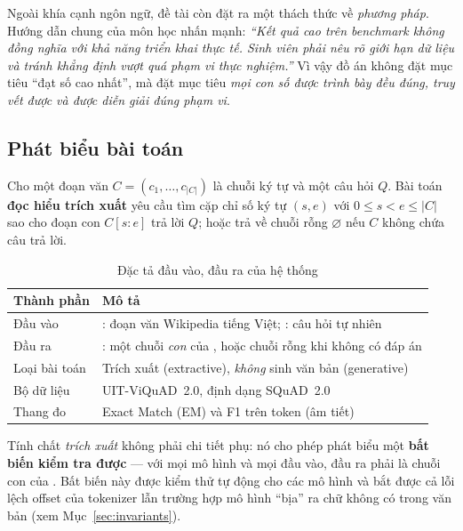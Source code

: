 Ngoài khía cạnh ngôn ngữ, đề tài còn đặt ra một thách thức về \emph{phương pháp}. Hướng
dẫn chung của môn học nhấn mạnh: \emph{``Kết quả cao trên benchmark không đồng nghĩa với
khả năng triển khai thực tế. Sinh viên phải nêu rõ giới hạn dữ liệu và tránh khẳng định
vượt quá phạm vi thực nghiệm.''} Vì vậy đồ án không đặt mục tiêu ``đạt số cao nhất'', mà
đặt mục tiêu \emph{mọi con số được trình bày đều đúng, truy vết được và được diễn giải
đúng phạm vi}.

\subsection{Phát biểu bài toán}
\label{sec:problem}

Cho một đoạn văn $C = (c_1, \dots, c_{|C|})$ là chuỗi ký tự và một câu hỏi $Q$. Bài toán
\textbf{đọc hiểu trích xuất} yêu cầu tìm cặp chỉ số ký tự $(s, e)$ với
$0 \le s < e \le |C|$ sao cho đoạn con $C[s{:}e]$ trả lời $Q$; hoặc trả về chuỗi rỗng
$\varnothing$ nếu $C$ không chứa câu trả lời.

\begin{table}[htbp]
\centering
\caption{Đặc tả đầu vào, đầu ra của hệ thống}
\label{tab:io}
\renewcommand{\arraystretch}{1.2}
\begin{tabularx}{\textwidth}{@{}l L@{}}
\toprule
\textbf{Thành phần} & \textbf{Mô tả} \\
\midrule
Đầu vào & : đoạn văn Wikipedia tiếng Việt; : câu hỏi tự nhiên \\
Đầu ra  & : một chuỗi \emph{con} của , hoặc chuỗi rỗng khi không có đáp án \\
Loại bài toán & Trích xuất (extractive), \emph{không} sinh văn bản (generative) \\
Bộ dữ liệu & UIT-ViQuAD~2.0, định dạng SQuAD~2.0 \\
Thang đo & Exact Match (EM) và F1 trên token (âm tiết) \\
\bottomrule
\end{tabularx}
\end{table}

Tính chất \emph{trích xuất} không phải chi tiết phụ: nó cho phép phát biểu một
\textbf{bất biến kiểm tra được} --- với mọi mô hình và mọi đầu vào, đầu ra phải là chuỗi
con của . Bất biến này được kiểm thử tự động cho các mô hình và bắt được
cả lỗi lệch offset của tokenizer lẫn trường hợp mô hình ``bịa'' ra chữ không có trong
văn bản (xem Mục~\ref{sec:invariants}).

